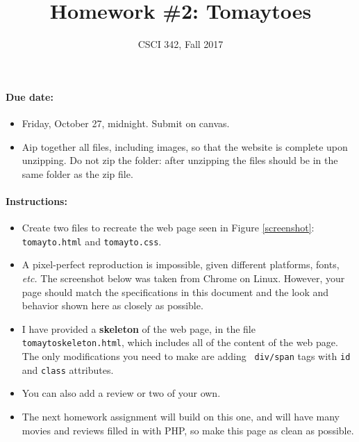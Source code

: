 \documentclass{article}
\title{Homework \#2: Tomaytoes}
\author{CSCI 342, Fall 2017}
\begin{document}
\maketitle


\paragraph{Due date:}
\begin{itemize}
  \item
Friday, October 27, midnight.  Submit on canvas.
\item Aip together all files, including images, so that the website
  is complete upon unzipping.  Do not zip the folder: after unzipping
  the files should be in the same folder as the zip file.
  \end{itemize}

\paragraph{Instructions:}
\begin{itemize}
  \item
Create two files to recreate the web page seen
in Figure \ref{screenshot}:
{\tt tomayto.html} and
{\tt tomayto.css}.
\item
A pixel-perfect reproduction is impossible, given different
platforms, fonts, {\em etc.}  The screenshot below was taken from
Chrome on Linux.  However, your page should match the
specifications in this document and the look and behavior shown
here as closely as possible.
\item
I have provided a {\bf skeleton} of the web page, in the file {\tt
  tomaytoskeleton.html}, which includes all of the content of the
web page.  The only modifications you need to make are adding {\tt
  div/span} tags with {\tt id} and {\tt class} attributes.
\item
You can also add a review or two of your own.
\item
The next homework assignment will build on this one, and will have
many movies and reviews filled in with PHP, so make this page as
clean as possible.
\end{itemize}
\end{document}
